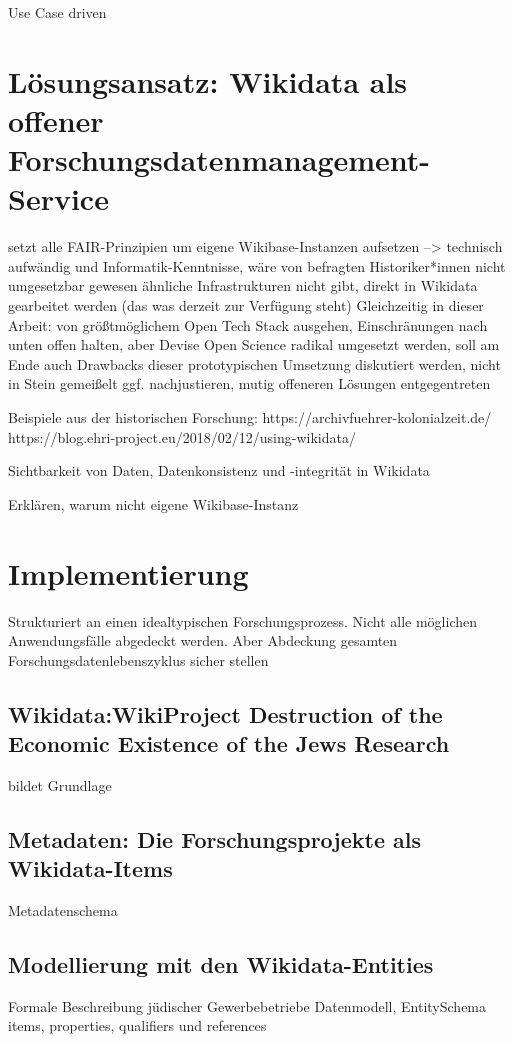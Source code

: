 \onehalfspacing

Use Case driven

\section{Lösungsansatz: Wikidata als offener Forschungsdatenmanagement-Service}

setzt alle FAIR-Prinzipien um
eigene Wikibase-Instanzen aufsetzen --> technisch aufwändig und Informatik-Kenntnisse, wäre von befragten Historiker*innen nicht umgesetzbar gewesen
ähnliche Infrastrukturen nicht gibt, direkt in Wikidata gearbeitet werden (das was derzeit zur Verfügung steht)
Gleichzeitig in dieser Arbeit: von größtmöglichem Open Tech Stack ausgehen, Einschränungen nach unten offen halten, aber Devise Open Science radikal umgesetzt werden, soll am Ende auch Drawbacks dieser prototypischen Umsetzung diskutiert werden, nicht in Stein gemeißelt ggf. nachjustieren, mutig offeneren Lösungen entgegentreten

Beispiele aus der historischen Forschung:
https://archivfuehrer-kolonialzeit.de/
https://blog.ehri-project.eu/2018/02/12/using-wikidata/


Sichtbarkeit von Daten, Datenkonsistenz und -integrität in Wikidata

Erklären, warum nicht eigene Wikibase-Instanz

\section{Implementierung}

Strukturiert an einen idealtypischen Forschungsprozess. Nicht alle möglichen Anwendungsfälle abgedeckt werden. Aber Abdeckung gesamten Forschungsdatenlebenszyklus sicher stellen

\subsection{Wikidata:WikiProject Destruction of the Economic Existence of the Jews Research}
bildet Grundlage

\subsection{Metadaten: Die Forschungsprojekte als Wikidata-Items}
Metadatenschema

\subsection{Modellierung mit den Wikidata-Entities}
Formale Beschreibung jüdischer Gewerbebetriebe Datenmodell, 
EntitySchema items, properties, qualifiers und references
